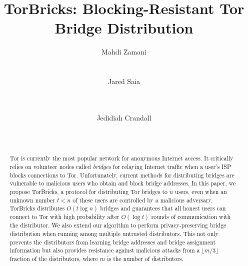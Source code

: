\documentclass{sig-alternate-05-2015}
\title{TorBricks: Blocking-Resistant Tor Bridge Distribution}
\author{
	\alignauthor
	Mahdi Zamani\\[0.3em]
	\affaddr{Yale University}\\[0.1em]
	\affaddr{New Haven, CT}\\[0.3em]
	\email{mahdi.zamani@yale.edu}
	\alignauthor
	Jared Saia\\[0.3em]
	\affaddr{University of New Mexico}\\[0.1em]
	\affaddr{Albuquerque, NM}\\[0.3em]
	\email{saia@cs.unm.edu}	
	\and
	\alignauthor 
	Jedidiah Crandall\\[0.3em]
	\affaddr{University of New Mexico}\\[0.1em]
	\affaddr{Albuquerque, NM}\\[0.3em]
	\email{crandall@cs.unm.edu}
}
\newcommand{\bricks}{}
\def\bricks/{\mbox{TorBricks}}
\begin{document}
\sloppy
\maketitle

\begin{abstract}
{%
Tor is currently the most popular network for anonymous Internet access. It critically relies on volunteer nodes called \emph{bridges} for relaying Internet traffic when a user's ISP blocks connections to Tor. 
Unfortunately, current methods for distributing bridges are vulnerable to malicious users who obtain and block bridge addresses.
In this paper, we propose \bricks/, a protocol for distributing Tor bridges to $n$ users, even when an unknown number ${t < n}$ of these users are controlled by a malicious adversary. \bricks/ distributes $O(t\log{n})$ bridges and guarantees that all honest users can connect to Tor with high probability after $O(\log{t})$ rounds of communication with the distributor. %
\newline We also extend our algorithm to perform privacy-preserving bridge distribution when running among multiple untrusted distributors. This not only prevents the distributors from learning bridge addresses and bridge assignment information but also provides resistance against malicious attacks from a $\lfloor m/3 \rfloor$ fraction of the distributors, where $m$ is the number of distributors.}
\end{abstract}

\maketitle
\end{document}
